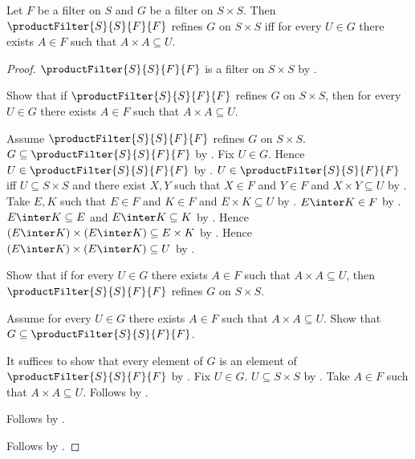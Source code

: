 \begin{theorem}\label{self_product_filter_refines_iff_squares}
    Let $F$ be a filter on $S$ and $G$ be a filter on $S\times S$.
    Then $\productFilter{S}{S}{F}{F}$ refines $G$ on $S\times S$ iff
        for every $U\in G$ there exists $A\in F$ such that
            $A\times A\subseteq U$.
\end{theorem}
\begin{proof}
    $\productFilter{S}{S}{F}{F}$ is a filter on $S\times S$ by
        .

    Show that if $\productFilter{S}{S}{F}{F}$ refines $G$ on
        $S\times S$, then for every $U\in G$ there exists $A\in F$
        such that $A\times A\subseteq U$.
    \begin{subproof}
        Assume $\productFilter{S}{S}{F}{F}$ refines $G$ on
            $S\times S$.
        $G\subseteq\productFilter{S}{S}{F}{F}$ by
            .
        Fix $U\in G$.
        Hence $U\in\productFilter{S}{S}{F}{F}$ by .
        $U\in\productFilter{S}{S}{F}{F}$ iff
            $U\subseteq S\times S$ and there exist $X,Y$ such that
            $X\in F$ and $Y\in F$ and $X\times Y\subseteq U$ by
            .
        Take $E,K$ such that $E\in F$ and $K\in F$ and
            $E\times K\subseteq U$ by \auto.
        $E\inter K\in F$ by .
        $E\inter K\subseteq E$ and $E\inter K\subseteq K$ by
            .
        Hence $(E\inter K)\times(E\inter K)\subseteq E\times K$ by
            .
        Hence $(E\inter K)\times(E\inter K)\subseteq U$ by
            .
    \end{subproof}

    Show that if for every $U\in G$ there exists $A\in F$ such that
        $A\times A\subseteq U$, then
        $\productFilter{S}{S}{F}{F}$ refines $G$ on $S\times S$.
    \begin{subproof}
        Assume for every $U\in G$ there exists $A\in F$ such that
            $A\times A\subseteq U$.
        Show that $G\subseteq\productFilter{S}{S}{F}{F}$.
        \begin{subproof}
            It suffices to show that every element of $G$ is an element of
                $\productFilter{S}{S}{F}{F}$ by .
            Fix $U\in G$.
            $U\subseteq S\times S$ by .
            Take $A\in F$ such that $A\times A\subseteq U$.
            Follows by .
        \end{subproof}
        Follows by .
    \end{subproof}
    Follows by \auto.
\end{proof}

